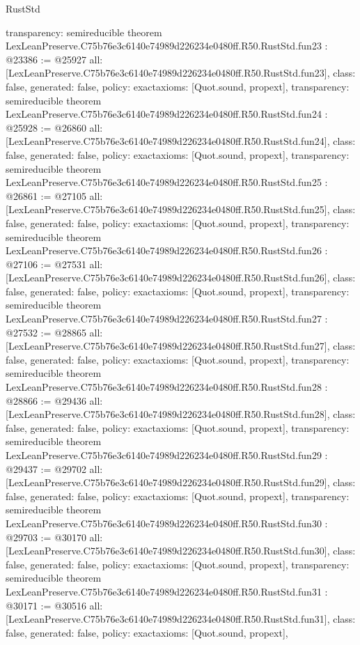 \begin{lexlean}{RustStd}
\begin{coremodule}
{  transparency: semireducible
}
theorem LexLeanPreserve.C75b76e3c6140e74989d226234e0480ff.R50.RustStd.fun23 : @23386 := @25927 {
  all: [LexLeanPreserve.C75b76e3c6140e74989d226234e0480ff.R50.RustStd.fun23],
  class: false,
  generated: false,
  policy: exact{axioms: [Quot.sound, propext]},
  transparency: semireducible
}
theorem LexLeanPreserve.C75b76e3c6140e74989d226234e0480ff.R50.RustStd.fun24 : @25928 := @26860 {
  all: [LexLeanPreserve.C75b76e3c6140e74989d226234e0480ff.R50.RustStd.fun24],
  class: false,
  generated: false,
  policy: exact{axioms: [Quot.sound, propext]},
  transparency: semireducible
}
theorem LexLeanPreserve.C75b76e3c6140e74989d226234e0480ff.R50.RustStd.fun25 : @26861 := @27105 {
  all: [LexLeanPreserve.C75b76e3c6140e74989d226234e0480ff.R50.RustStd.fun25],
  class: false,
  generated: false,
  policy: exact{axioms: [Quot.sound, propext]},
  transparency: semireducible
}
theorem LexLeanPreserve.C75b76e3c6140e74989d226234e0480ff.R50.RustStd.fun26 : @27106 := @27531 {
  all: [LexLeanPreserve.C75b76e3c6140e74989d226234e0480ff.R50.RustStd.fun26],
  class: false,
  generated: false,
  policy: exact{axioms: [Quot.sound, propext]},
  transparency: semireducible
}
theorem LexLeanPreserve.C75b76e3c6140e74989d226234e0480ff.R50.RustStd.fun27 : @27532 := @28865 {
  all: [LexLeanPreserve.C75b76e3c6140e74989d226234e0480ff.R50.RustStd.fun27],
  class: false,
  generated: false,
  policy: exact{axioms: [Quot.sound, propext]},
  transparency: semireducible
}
theorem LexLeanPreserve.C75b76e3c6140e74989d226234e0480ff.R50.RustStd.fun28 : @28866 := @29436 {
  all: [LexLeanPreserve.C75b76e3c6140e74989d226234e0480ff.R50.RustStd.fun28],
  class: false,
  generated: false,
  policy: exact{axioms: [Quot.sound, propext]},
  transparency: semireducible
}
theorem LexLeanPreserve.C75b76e3c6140e74989d226234e0480ff.R50.RustStd.fun29 : @29437 := @29702 {
  all: [LexLeanPreserve.C75b76e3c6140e74989d226234e0480ff.R50.RustStd.fun29],
  class: false,
  generated: false,
  policy: exact{axioms: [Quot.sound, propext]},
  transparency: semireducible
}
theorem LexLeanPreserve.C75b76e3c6140e74989d226234e0480ff.R50.RustStd.fun30 : @29703 := @30170 {
  all: [LexLeanPreserve.C75b76e3c6140e74989d226234e0480ff.R50.RustStd.fun30],
  class: false,
  generated: false,
  policy: exact{axioms: [Quot.sound, propext]},
  transparency: semireducible
}
theorem LexLeanPreserve.C75b76e3c6140e74989d226234e0480ff.R50.RustStd.fun31 : @30171 := @30516 {
  all: [LexLeanPreserve.C75b76e3c6140e74989d226234e0480ff.R50.RustStd.fun31],
  class: false,
  generated: false,
  policy: exact{axioms: [Quot.sound, propext]},
}
\end{coremodule}
\end{lexlean}
